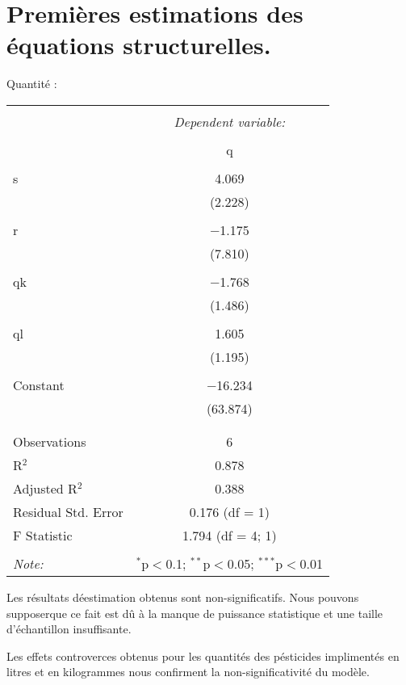 \documentclass[11pt, a4paper]{article}
\begin{document}
\newpage
\section*{Premières estimations des équations structurelles.}
\par
Quantité :
\FloatBarrier
\begin{center}
\begin{tabular}{@{\extracolsep{5pt}}lc} 
\\[-1.8ex]\hline 
\hline \\[-1.8ex] 
 & \multicolumn{1}{c}{\textit{Dependent variable:}} \\ 
\cline{2-2} 
\\[-1.8ex] & q \\ 
\hline \\[-1.8ex]
 s & 4.069 \\ 
  & (2.228) \\ 
  & \\ 
 r & $-$1.175 \\ 
  & (7.810) \\ 
  & \\
 qk & $-$1.768 \\ 
  & (1.486) \\ 
  & \\ 
 ql & 1.605 \\ 
  & (1.195) \\ 
  & \\
 Constant & $-$16.234 \\ 
  & (63.874) \\ 
  & \\ 
\hline \\[-1.8ex] 
Observations & 6 \\ 
R$^{2}$ & 0.878 \\ 
Adjusted R$^{2}$ & 0.388 \\ 
Residual Std. Error & 0.176 (df = 1) \\ 
F Statistic & 1.794 (df = 4; 1) \\ 
\hline 
\hline \\[-1.8ex] 
\textit{Note:}  & \multicolumn{1}{r}{$^{*}$p$<$0.1; $^{**}$p$<$0.05; $^{***}$p$<$0.01} 
\\
\end{tabular} 
\end{center}
\FloatBarrier
Les résultats déestimation obtenus sont non-significatifs.
Nous pouvons supposerque ce fait est dû à la manque de puissance statistique et une taille d'échantillon insuffisante.
\par
Les effets controverces obtenus pour les quantités des pésticides implimentés en litres et en kilogrammes nous confirment la non-significativité du modèle.
\end{document}
